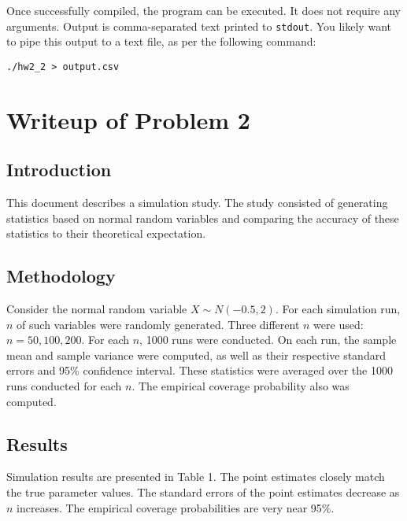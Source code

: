 \documentclass{article}
\begin{document}
Once successfully compiled, the program can be executed. It does not require any
arguments. Output is comma-separated text printed to \texttt{stdout}. You likely want to pipe this
output to a text file, as per the following command:

\begin{center}
	\texttt{./hw2\_2 > output.csv}
\end{center}

\section{Writeup of Problem 2}
\subsection{Introduction}
This document describes a simulation study. The study consisted of generating
statistics based on normal random variables and comparing the accuracy of these
statistics to their theoretical expectation.

\subsection{Methodology}
Consider the normal random variable $X \sim N(-0.5, 2)$. For each simulation
run, $n$ of such variables were randomly generated. Three different $n$ were
used:  $n=50, 100, 200$. For each $n$, 1000 runs were conducted. On each run,
the sample mean and sample variance were computed, as well as their respective standard errors and 95\%
confidence interval. These statistics were averaged over the 1000 runs conducted
for each $n$. The empirical coverage probability also was computed.

\subsection{Results}
Simulation results are presented in Table 1. The point estimates closely match
the true parameter values. The standard errors of the point estimates decrease
as $n$ increases. The empirical coverage probabilities are very near 95\%. 
\end{document}
